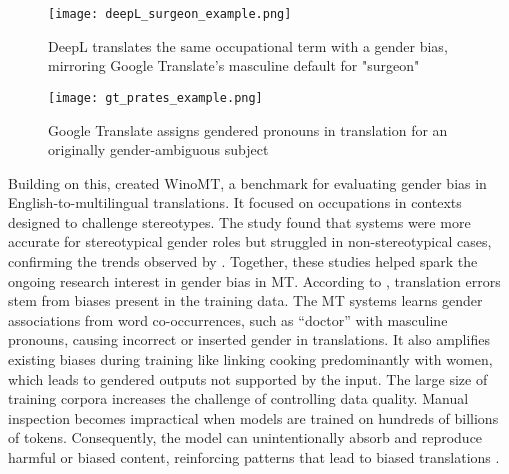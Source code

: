         \vspace{0.8em}
        \begin{figure}[htb]
            \centering
            \texttt{[image: deepL\_surgeon\_example.png]}
            \caption[Example of DeepL's biased translation]{DeepL translates the same occupational term with a gender bias, mirroring Google Translate's masculine default for "surgeon"}
            \label{fig:deepL_surgeon_example}
        \end{figure}

        \vspace{0.8em}
        \begin{figure}[htb]
            \centering
            \texttt{[image: gt\_prates\_example.png]}
            \caption[Google Translate Gendered Pronoun Suggestions]{Google Translate assigns gendered pronouns in translation for an originally gender-ambiguous subject}
            \label{fig:gt_prates_example}
        \end{figure}

        Building on this, \textcite{stanovskyEvaluatingGenderBias2019} created WinoMT, a benchmark for evaluating gender bias in English-to-multilingual translations. It focused on occupations in contexts designed to challenge stereotypes. The study found that systems were more accurate for stereotypical gender roles but struggled in non-stereotypical cases, confirming the trends observed by \citeauthor{pratesAssessingGenderBias2019}.
        Together, these studies helped spark the ongoing research interest in gender bias in MT. According to \textcite{ullmannGenderBiasMachine2022}, translation errors stem from biases present in the training data. The MT systems learns gender associations from word co-occurrences, such as “doctor” with masculine pronouns, causing incorrect or inserted gender in translations. It also amplifies existing biases during training like linking cooking predominantly with women, which leads to gendered outputs not supported by the input. The large size of training corpora increases the challenge of controlling data quality. Manual inspection becomes impractical when models are trained on hundreds of billions of tokens. Consequently, the model can unintentionally absorb and reproduce harmful or biased content, reinforcing patterns that lead to biased translations \citep{ullmannGenderBiasMachine2022}.


